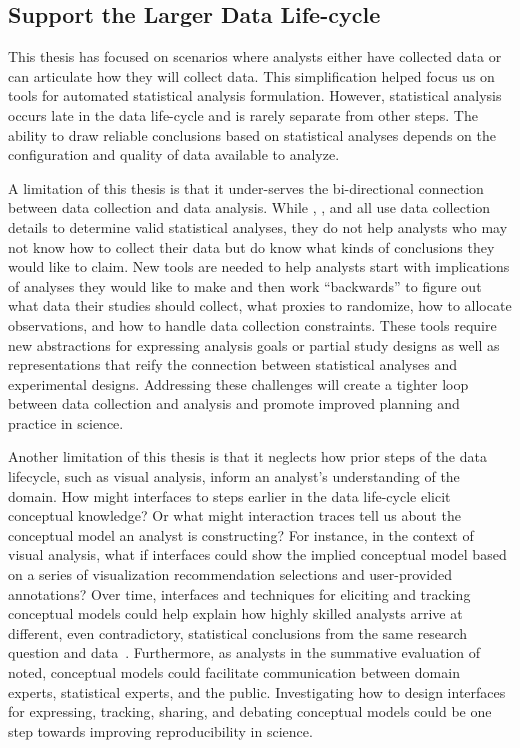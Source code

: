 \subsection{Support the Larger Data Life-cycle}

This thesis has focused on scenarios where analysts either have collected data
or can articulate how they will collect data. This simplification helped focus
us on tools for automated statistical analysis formulation. However, statistical
analysis occurs late in the data life-cycle and is rarely separate from other
steps. The ability to draw reliable conclusions based on statistical analyses
depends on the configuration and quality of data available to analyze. 


A limitation of this thesis is that it under-serves the bi-directional
connection between data collection and data analysis. While \tea, \tisane, and
\rTisane all use data collection details to determine valid statistical
analyses, they do not help analysts who may not know how to collect their data
but do know what kinds of conclusions they would like to claim. New tools are
needed to help analysts start with implications of analyses they would like to
make and then work ``backwards'' to figure out what data their studies should
collect, what proxies to randomize, how to allocate observations, and how to
handle data collection constraints. These tools require new abstractions for
expressing analysis goals or partial study designs as well as representations
that reify the connection between statistical analyses and experimental designs.
Addressing these challenges will create a tighter loop between data collection
and analysis and promote improved planning and practice in science.

Another limitation of this thesis is that it neglects how prior steps of the
data lifecycle, such as visual analysis, inform an analyst's understanding of
the domain. How might interfaces to steps earlier in the data life-cycle elicit
conceptual knowledge? Or what might interaction traces tell us about the
conceptual model an analyst is constructing? For instance, in the context of
visual analysis, what if interfaces could show the implied conceptual model
based on a series of visualization recommendation selections and user-provided
annotations? Over time, interfaces and techniques for eliciting and tracking
conceptual models could help explain how highly skilled analysts arrive at
different, even contradictory, statistical conclusions from the same research
question and data~\cite{silberzahn2018manyAnalysts}. Furthermore, as analysts in
the summative evaluation of \rTisane noted, conceptual models could facilitate
communication between domain experts, statistical experts, and the public.
Investigating how to design interfaces for expressing, tracking, sharing, and
debating conceptual models could be one step towards improving reproducibility in science.

